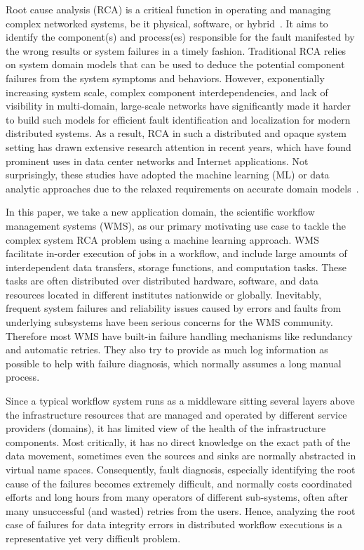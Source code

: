 Root cause analysis (RCA) is a critical function in operating and managing complex networked systems, be it physical, software, or hybrid~\cite{RCA-Review-2017}.
It aims to identify the component(s) and process(es) responsible for the fault manifested by the wrong results or system failures in a timely fashion.
Traditional RCA relies on system domain models that can be used to deduce the potential component failures from the system symptoms and behaviors.
However, exponentially increasing system scale, complex component interdependencies, and lack of visibility in multi-domain, large-scale networks have 
significantly made it harder to build such models for efficient fault identification and localization for modern distributed systems. 
As a result, RCA in such a distributed and opaque system setting has drawn extensive research attention in recent years, which have found prominent uses in data center networks 
and Internet applications. Not surprisingly, these studies have adopted the machine learning (ML) or data analytic approaches
due to the relaxed requirements on accurate domain models~\cite{netbouncer:nsdi18,Link-JIoT-2019}.

In this paper, we take a new application domain, the scientific workflow management systems (WMS), as our primary motivating use case to tackle the complex system RCA problem 
using a machine learning approach. WMS facilitate in-order execution of jobs in a workflow, and include large amounts of interdependent data transfers, storage functions, and computation tasks. 
These tasks are often distributed over distributed hardware, software, and data resources located in different institutes nationwide or globally. 
Inevitably, frequent system failures and reliability issues 
caused by errors and faults from underlying subsystems have been serious concerns for the WMS community. 
Therefore most WMS have built-in failure handling mechanisms like redundancy and automatic retries. 
They also try to provide as much log information as possible to help with failure diagnosis, which normally assumes a long manual process.

Since a typical workflow system runs as a middleware sitting several layers above the infrastructure resources that are managed 
and operated by different service providers (domains), it has limited view of the health of the infrastructure components. 
Most critically, it has no direct knowledge on the exact path of the data movement,
sometimes even the sources and sinks are normally abstracted in virtual name spaces.  
Consequently, fault diagnosis, especially identifying the root cause of the failures becomes extremely difficult, and normally 
costs coordinated efforts and long hours from many operators of different sub-systems, often after many unsuccessful (and wasted) retries from the users. 
Hence, analyzing the root case of failures for data integrity errors in distributed workflow executions is a representative yet very difficult problem.

